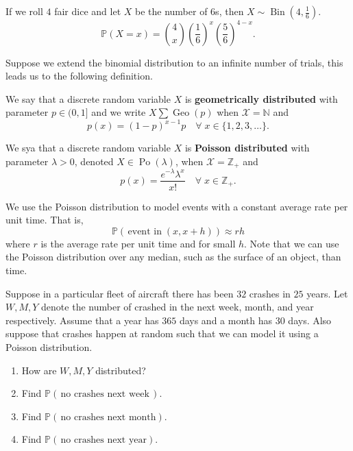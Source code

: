\begin{example}
    If we roll $4$ fair dice and let $X$ be the number of $6$s, then $X \sim \operatorname{Bin}\left(4, \frac16\right)$. \[ \mathbb P(X = x) = \binom{4}{x} \left(\frac16\right)^x\left(\frac56\right)^{4 - x}. \]
\end{example}

Suppose we extend the binomial distribution to an infinite number of trials, this leads us to the following definition.

\begin{definition}
    We say that a discrete random variable $X$ is \textbf{geometrically distributed} with parameter $p \in (0, 1]$ and we write $X \sum \operatorname{Geo}(p)$ when $\mathcal X = \mathbb N$ and \[ p(x) = (1 - p)^{x - 1} p \quad \forall \; x \in \{ 1, 2, 3, \ldots \}. \]
\end{definition}

\begin{definition}
    We sya that a discrete random variable $X$ is \textbf{Poisson distributed} with parameter $\lambda > 0$, denoted $X \in \operatorname{Po}(\lambda)$, when $\mathcal X = \mathbb Z_+$ and \[ p(x) = \frac{e^{-\lambda} \lambda^x}{x!} \quad \forall \; x \in \mathbb Z_+. \]
\end{definition}

We use the Poisson distribution to model events with a constant average rate per unit time. That is, \[ \mathbb P(\, \text{event in} \; (x, x + h)) \approx rh \] where $r$ is the average rate per unit time and for small $h$. Note that we can use the Poisson distribution over any median, such as the surface of an object, than time.

\begin{example}
    Suppose in a particular fleet of aircraft there has been $32$ crashes in $25$ years. Let $W, M, Y$ denote the number of crashed in the next week, month, and year respectively. Assume that a year has $365$ days and a month has $30$ days. Also suppose that crashes happen at random such that we can model it using a Poisson distribution.
    \begin{enumerate}
        \item How are $W, M, Y$ distributed?
        \item Find $\mathbb P(\, \text{no crashes next week} \,)$.
        \item Find $\mathbb P(\, \text{no crashes next month})$.
        \item Find $\mathbb P(\, \text{no crashes next year})$.
    \end{enumerate}
\end{example}

